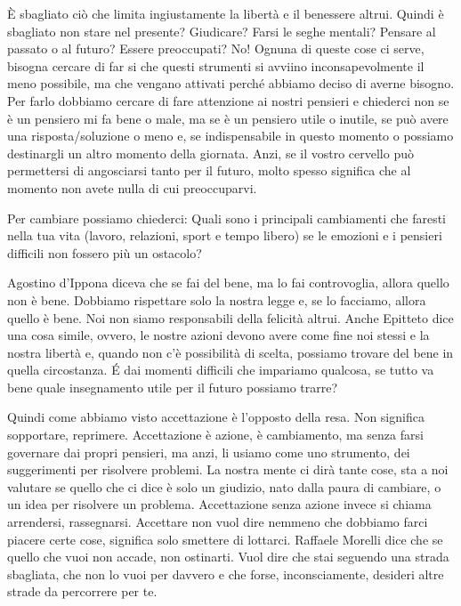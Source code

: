 \documentclass[12pt]{book} %
\begin{document}
È sbagliato ciò che limita ingiustamente la libertà e il benessere altrui. Quindi è sbagliato non stare
nel presente? Giudicare? Farsi le seghe mentali? Pensare al passato o al futuro? Essere preoccupati? No! Ognuna di
queste cose ci serve, bisogna cercare di far si che questi strumenti si avviino inconsapevolmente il meno possibile, ma che
vengano attivati perché abbiamo deciso di averne bisogno. Per farlo dobbiamo cercare di fare attenzione ai nostri
pensieri e chiederci non se è un pensiero mi fa bene o male, ma se è un pensiero utile o inutile, se può avere una
risposta/soluzione o meno e, se indispensabile in questo momento o possiamo destinargli un altro momento della
giornata. Anzi, se il vostro cervello può permettersi di angosciarsi tanto per il futuro, molto spesso significa che al
momento non avete nulla di cui preoccuparvi.

Per cambiare possiamo chiederci: Quali sono i principali cambiamenti che faresti nella tua vita (lavoro, relazioni,
sport e tempo libero) se le emozioni e i pensieri difficili non fossero più un ostacolo?

Agostino d'Ippona diceva che se fai del bene, ma lo fai controvoglia, allora quello non è bene. Dobbiamo rispettare solo
la nostra legge e, se lo facciamo, allora quello è bene. Noi non siamo responsabili della felicità altrui. Anche
Epitteto dice una cosa simile, ovvero, le nostre azioni devono avere come fine noi stessi e la nostra libertà e, quando
non c'è possibilità di scelta, possiamo trovare del bene in quella circostanza. É dai momenti difficili che impariamo qualcosa, se tutto va bene quale insegnamento utile per il futuro possiamo trarre?

Quindi come abbiamo visto accettazione è l'opposto della resa. Non significa sopportare, reprimere.
Accettazione è azione, è cambiamento, ma senza farsi governare dai propri pensieri, ma anzi, li usiamo come uno
strumento, dei suggerimenti per risolvere problemi. La nostra mente ci dirà tante cose, sta a noi valutare se quello
che ci dice è solo un giudizio, nato dalla paura di cambiare, o un idea per risolvere un problema. Accettazione senza
azione invece si chiama arrendersi, rassegnarsi. Accettare non vuol dire nemmeno che dobbiamo farci piacere certe cose,
significa solo smettere di lottarci.
Raffaele Morelli dice che se quello che vuoi non accade, non ostinarti. Vuol dire che stai seguendo una strada sbagliata, che non lo vuoi per davvero e che forse, inconsciamente, desideri altre strade da percorrere per te. 
\end{document}
